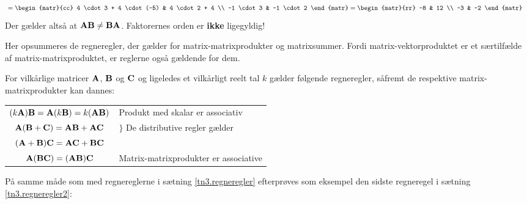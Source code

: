 \begin{example}
\begin{equation}
\begin{aligned}
&= \begin{matr}{cc} 4 \cdot 3 + 4 \cdot (-5) & 4 \cdot 2 + 4 \\ -1 \cdot 3 & -1 \cdot 2 \end{matr} = \begin{matr}{rr} -8 & 12 \\ -3 & -2 \end{matr}
\end{aligned}
\end{equation}
Der gælder altså at $ \mathbf{A} \mathbf{B} \neq \mathbf{B} \mathbf{A} $. Faktorernes orden er \textbf{ikke} ligegyldig!
\end{example}

Her opsummeres de regneregler, der gælder for matrix-matrixprodukter og matrixsummer. Fordi matrix-vektorproduktet er et særtilfælde af matrix-matrixproduktet, er reglerne også gældende for dem.

\begin{theorem} \label{tn3.regneregler2}
For vilkårlige matricer $ \mathbf{A} $, $ \mathbf{B} $ og $ \mathbf{C} $ og ligeledes et vilkårligt reelt tal $ k $ gælder følgende regneregler, såfremt de respektive matrix-matrixprodukter kan dannes: \smallskip \\
\begin{tabular}{cl}
$ (k\mathbf{A})\mathbf{B} = \mathbf{A}(k\mathbf{B}) = k(\mathbf{A}\mathbf{B}) $ & Produkt med skalar er associativ \smallskip \\
$ \mathbf{A}(\mathbf{B} + \mathbf{C}) = \mathbf{A}\mathbf{B} + \mathbf{A}\mathbf{C} $ & \multirow{2}{10cm}{$\biggr\rbrace$ De distributive regler gælder} \smallskip \\
$ (\mathbf{A} + \mathbf{B})\mathbf{C} = \mathbf{A}\mathbf{C} + \mathbf{B}\mathbf{C} $ &  \smallskip  \\
$ \mathbf{A}(\mathbf{B}\mathbf{C}) = (\mathbf{A}\mathbf{B})\mathbf{C} $ & Matrix-matrixprodukter er associative \\
\end{tabular}
\end{theorem}

På samme måde som med regnereglerne i sætning \ref{tn3.regneregler} efterprøves som eksempel den sidste regneregel i sætning \ref{tn3.regneregler2}:

